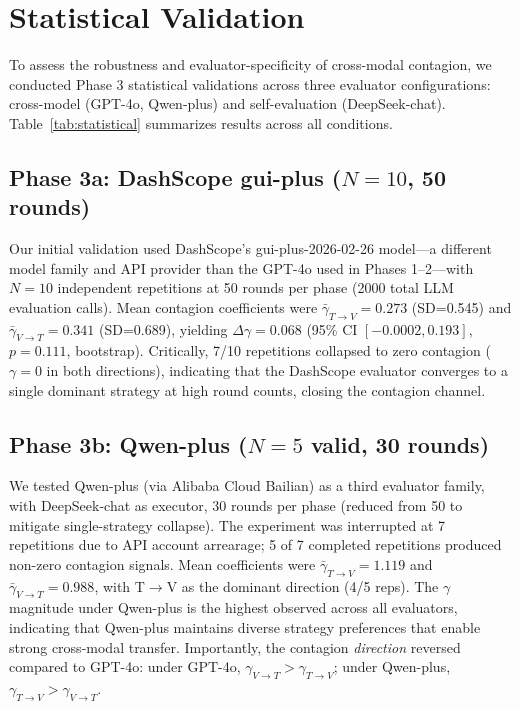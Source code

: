 \documentclass[11pt,a4paper]{article}
\begin{document}
\section{Statistical Validation}

To assess the robustness and evaluator-specificity of cross-modal contagion, we conducted Phase 3 statistical validations across three evaluator configurations: cross-model (GPT-4o, Qwen-plus) and self-evaluation (DeepSeek-chat). Table~\ref{tab:statistical} summarizes results across all conditions.

\subsection{Phase 3a: DashScope gui-plus ($N=10$, 50 rounds)}

Our initial validation used DashScope's gui-plus-2026-02-26 model---a different model family and API provider than the GPT-4o used in Phases 1--2---with $N=10$ independent repetitions at 50 rounds per phase (2000 total LLM evaluation calls). Mean contagion coefficients were $\bar{\gamma}_{T\to V}=0.273$ (SD=0.545) and $\bar{\gamma}_{V\to T}=0.341$ (SD=0.689), yielding $\Delta\gamma=0.068$ (95\% CI $[-0.0002, 0.193]$, $p=0.111$, bootstrap). Critically, 7/10 repetitions collapsed to zero contagion ($\gamma=0$ in both directions), indicating that the DashScope evaluator converges to a single dominant strategy at high round counts, closing the contagion channel.

\subsection{Phase 3b: Qwen-plus ($N=5$ valid, 30 rounds)}

We tested Qwen-plus (via Alibaba Cloud Bailian) as a third evaluator family, with DeepSeek-chat as executor, 30 rounds per phase (reduced from 50 to mitigate single-strategy collapse). The experiment was interrupted at 7 repetitions due to API account arrearage; 5 of 7 completed repetitions produced non-zero contagion signals. Mean coefficients were $\bar{\gamma}_{T\to V}=1.119$ and $\bar{\gamma}_{V\to T}=0.988$, with T$\to$V as the dominant direction (4/5 reps). The $\gamma$ magnitude under Qwen-plus is the highest observed across all evaluators, indicating that Qwen-plus maintains diverse strategy preferences that enable strong cross-modal transfer. Importantly, the contagion \textit{direction} reversed compared to GPT-4o: under GPT-4o, $\gamma_{V\to T} > \gamma_{T\to V}$; under Qwen-plus, $\gamma_{T\to V} > \gamma_{V\to T}$.
\end{document}
